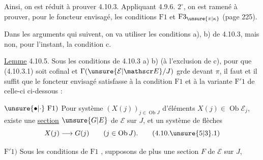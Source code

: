Ainsi, on est réduit à prouver 4.10.3. Appliquant 4.9.6. $2^\circ$, on est ramené à prouver, pour le foncteur envisagé, les conditions $\mathrm F1$ et $\mathrm F3_{\unsure{\pi|\kappa}}$ (page 225).

Dans les arguments qui suivent, on va utiliser les conditions a), b) de 4.10.3, mais non, pour l'instant, la condition c.

\uline{Lemme} 4.10.5. Sous les conditions de 4.10.3 a) b) (à l'exclusion de c), pour que (4.10.3.1) soit cofinal et $\Gamma(\unsure{\mathcal E|\mathscr E}/J)$ grde devant $\pi$, il faut et il suffit que le foncteur envisagé satisfasse à la condition $\mathrm F1$   et à la variante $\mathrm F'1$ de celle-ci  ci-dessous :

$\unsure{\bullet|\cdot}\ \mathrm F1)$ Pour  système $(X(j))_{j\in\operatorname{Ob}J}$ d'éléments $X(j)\in\operatorname{Ob}\mathcal E_j$, existe une \uline{section} $\unsure{G|E}$ de $\mathcal E$ sur $J$, et un système de flèches
\[
 X(j)\longrightarrow G(j)\qquad (j\in\operatorname{Ob}J). \tag*{(4.10.\unsure{5|3}.1)}
\]

$\mathrm F'1)$ Sous les conditions de $\mathrm F1$ , supposons de plus une section $F$ de $\mathcal E$ sur $J$,
